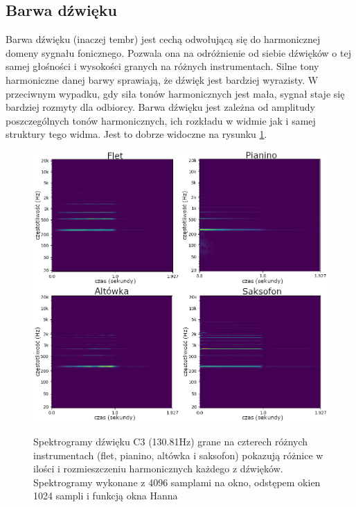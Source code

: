 \documentclass[12pt,a4paper,twoside]{mwart}
\begin{document}
\subsection{Barwa dźwięku}\label{sec:barwaDzwieku}
Barwa dźwięku (inaczej tembr) jest cechą odwołującą się do harmonicznej domeny sygnału fonicznego. Pozwala ona na odróżnienie od siebie dźwięków o tej samej głośności i wysokości granych na różnych instrumentach. Silne tony harmoniczne danej barwy sprawiają, że dźwięk jest bardziej wyrazisty. W przeciwnym wypadku, gdy siła tonów harmonicznych jest mała, sygnał staje się bardziej rozmyty dla odbiorcy. Barwa dźwięku jest zależna od amplitudy poszczególnych tonów harmonicznych, ich rozkładu w widmie jak i samej struktury tego widma. Jest to dobrze widoczne na rysunku \ref{fig:spektrogram}.

\begin{figure}[t]
  \begin{center}
  \includegraphics[scale=0.4]{images/spectogram_instruments.png}\\
  \caption{Spektrogramy dźwięku C3 (130.81Hz) grane na czterech różnych instrumentach (flet, pianino, altówka i saksofon) pokazują różnice w ilości i rozmieszczeniu harmonicznych każdego z dźwięków. Spektrogramy wykonane z 4096 samplami na okno, odstępem okien 1024 sampli i funkcją okna Hanna}
  \label{fig:spektrogram}
  \end{center}
\end{figure}
\end{document}
